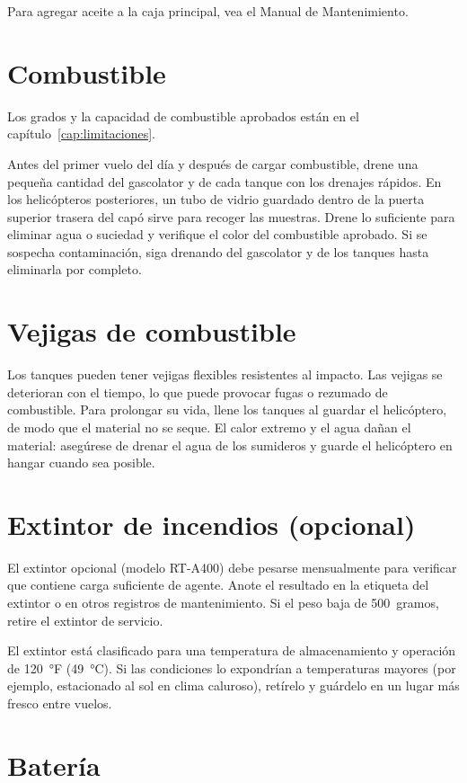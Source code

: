 Para agregar aceite a la caja principal, vea el Manual de Mantenimiento.

\section{Combustible}

Los grados y la capacidad de combustible aprobados están en el capítulo~\ref{cap:limitaciones}.

Antes del primer vuelo del día y después de cargar combustible, drene una pequeña cantidad del gascolator y de cada tanque con los drenajes rápidos. En los helicópteros posteriores, un tubo de vidrio guardado dentro de la puerta superior trasera del capó sirve para recoger las muestras. Drene lo suficiente para eliminar agua o suciedad y verifique el color del combustible aprobado. Si se sospecha contaminación, siga drenando del gascolator y de los tanques hasta eliminarla por completo.

\section{Vejigas de combustible}

Los tanques pueden tener vejigas flexibles resistentes al impacto. Las vejigas se deterioran con el tiempo, lo que puede provocar fugas o rezumado de combustible. Para prolongar su vida, llene los tanques al guardar el helicóptero, de modo que el material no se seque. El calor extremo y el agua dañan el material: asegúrese de drenar el agua de los sumideros y guarde el helicóptero en hangar cuando sea posible.

\section{Extintor de incendios (opcional)}

El extintor opcional (modelo RT-A400) debe pesarse mensualmente para verificar que contiene carga suficiente de agente. Anote el resultado en la etiqueta del extintor o en otros registros de mantenimiento. Si el peso baja de 500~gramos, retire el extintor de servicio.

El extintor está clasificado para una temperatura de almacenamiento y operación de 120~°F (49~°C). Si las condiciones lo expondrían a temperaturas mayores (por ejemplo, estacionado al sol en clima caluroso), retírelo y guárdelo en un lugar más fresco entre vuelos.

\section{Batería}


